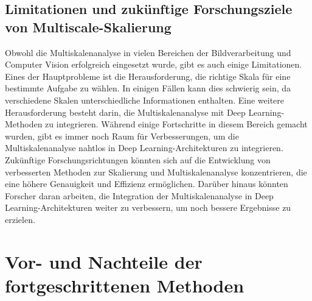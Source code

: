     \subsection{Limitationen und zukünftige Forschungsziele von Multiscale-Skalierung}
        Obwohl die Multiskalenanalyse in vielen Bereichen der Bildverarbeitung und Computer Vision erfolgreich eingesetzt wurde, gibt es auch einige Limitationen.  
        Eines der Hauptprobleme ist die Herausforderung, die richtige Skala für eine bestimmte Aufgabe zu wählen.      
        In einigen Fällen kann dies schwierig sein, da verschiedene Skalen unterschiedliche Informationen enthalten.
        Eine weitere Herausforderung besteht darin, die Multiskalenanalyse mit Deep Learning-Methoden zu integrieren.      
        Während einige Fortschritte in diesem Bereich gemacht wurden, gibt es immer noch Raum für Verbesserungen, um die Multiskalenanalyse nahtlos in Deep Learning-Architekturen zu integrieren.
        Zukünftige Forschungsrichtungen könnten sich auf die Entwicklung von verbesserten Methoden zur Skalierung und Multiskalenanalyse konzentrieren, die eine höhere Genauigkeit und Effizienz ermöglichen.      
        Darüber hinaus könnten Forscher daran arbeiten, die Integration der Multiskalenanalyse in Deep Learning-Architekturen weiter zu verbessern, um noch bessere Ergebnisse zu erzielen.

\section{Vor- und Nachteile der fortgeschrittenen Methoden}

